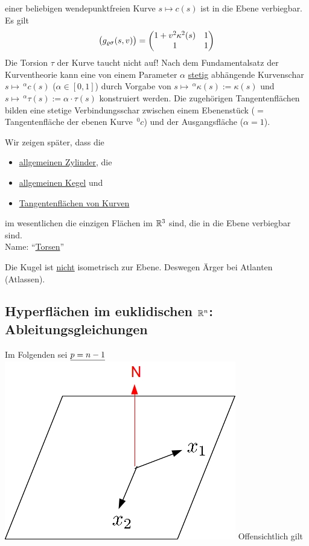 \begin{bsp}
\begin{enumerate}
\[  \]
  einer beliebigen wendepunktfreien Kurve \(s \mapsto c(s)\) ist in die Ebene verbiegbar. Es gilt
  \begin{align*}
   \big( g_{\varrho \sigma}(s,v)\big) = \begin{pmatrix}
                           1 + v^2 \kappa^2(s) & 1 \\
                           1 & 1
                          \end{pmatrix}
  \end{align*}
  Die Torsion \(\tau\) der Kurve taucht nicht auf! Nach dem Fundamentalsatz der Kurventheorie kann eine von einem Parameter \(\alpha\) \uline{stetig} abhängende Kurvenschar \(s \mapsto \,^\alpha c(s)\) (\(\alpha \in [0,1]\)) durch Vorgabe von \(s \mapsto \,^\alpha \kappa(s) := \kappa(s)\) und \(s \mapsto \,^\alpha \tau(s) := \alpha \cdot \tau(s)\) konstruiert werden. Die zugehörigen Tangentenflächen bilden eine stetige Verbindungsschar zwischen einem Ebenenstück (\(=\) Tangentenfläche der ebenen Kurve \(\,^0 c\)) und der Ausgangsfläche (\(\alpha = 1\)).
 \end{enumerate}
\end{bsp}

\begin{bemerkung}
 Wir zeigen später, dass die
 \begin{itemize}
  \item \uline{allgemeinen Zylinder}, die 
  \item \uline{allgemeinen Kegel} und 
  \item \uline{Tangentenflächen von Kurven}
 \end{itemize}
 im wesentlichen die einzigen Flächen im \(\mathbb{R}^3\) sind, die in die Ebene verbiegbar sind. \\
 Name: "`\uline{Torsen}"' \par
 Die Kugel ist \uline{nicht} isometrisch zur Ebene. Deswegen Ärger bei Atlanten (Atlassen).
\end{bemerkung}

\subsection{Hyperflächen im euklidischen $\mathbb{R}^n$: Ableitungsgleichungen}
Im Folgenden sei \(\uline{p = n-1}\) \qquad \includegraphics[scale=0.2]{Bilder/Bsp8.jpg}
Offensichtlich gilt

